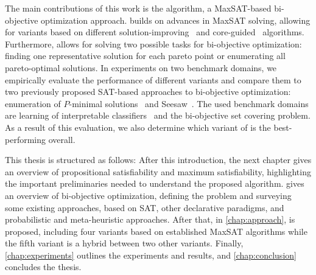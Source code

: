 The main contributions of this work is the \algname{} algorithm, a MaxSAT-based bi-objective optimization approach.
\algname{} builds on advances in MaxSAT solving, allowing for variants based on different solution-improving~\autocite{handbook2-maxsat,DBLP:journals/jsat/BerreP10,DBLP:journals/jsat/EenS06} and core-guided~\autocite{DBLP:journals/corr/abs-0712-1097,DBLP:conf/sat/AnsoteguiBL09,DBLP:conf/cp/MorgadoDM14,DBLP:journals/jsat/IgnatievMM19} algorithms.
Furthermore, \algname{} allows for solving two possible tasks for bi-objective optimization: finding one representative solution for each pareto point or enumerating all pareto-optimal solutions.
In experiments on two benchmark domains, we empirically evaluate the performance of different \algname{} variants and compare them to two previously proposed SAT-based approaches to bi-objective optimization: enumeration of $P$-minimal solutions~\autocite{DBLP:conf/cp/SohBTB17} and Seesaw~\autocite{DBLP:conf/cp/JanotaMSM21}.
The used benchmark domains are learning of interpretable classifiers~\autocite{DBLP:conf/cp/MaliotovM18} and the bi-objective set covering problem.
As a result of this evaluation, we also determine which variant of \algname{} is the best-performing overall.

This thesis is structured as follows:
After this introduction, the next chapter gives an overview of propositional satisfiability and maximum satisfiability, highlighting the important preliminaries needed to understand the proposed algorithm.
 gives an overview of bi-objective optimization, defining the problem and surveying some existing approaches, based on SAT, other declarative paradigms, and probabilistic and meta-heuristic approaches.
After that, in \cref{chap:approach}, \algname{} is proposed, including four variants based on established MaxSAT algorithms while the fifth variant is a hybrid between two other variants.
Finally, \cref{chap:experiments} outlines the experiments and results, and \cref{chap:conclusion} concludes the thesis.